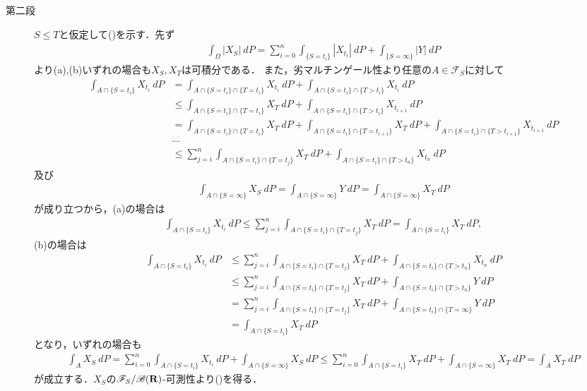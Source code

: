 \begin{prf}
\begin{description}
			\item[第二段]
				$S \leq T$と仮定して()を示す．先ず
				\begin{align}
					\int_\Omega |X_S|\ dP
					= \sum_{i=0}^n \int_{\{S=t_i\}} |X_{t_i}|\ dP
						+ \int_{\{S=\infty\}} |Y|\ dP
				\end{align}
				より(a),(b)いずれの場合も$X_S,X_T$は可積分である．
				また，劣マルチンゲール性より任意の$A \in \mathscr{F}_S$に対して
				\begin{align}
					\int_{A \cap \{S=t_i\}} X_{t_i}\ dP
					&= \int_{A \cap \{S=t_i\} \cap \{T=t_i\}} X_{t_i}\ dP
						+ \int_{A \cap \{S=t_i\} \cap \{T>t_i\}} X_{t_i}\ dP \\
					&\leq \int_{A \cap \{S=t_i\} \cap \{T=t_i\}} X_T\ dP
						+ \int_{A \cap \{S=t_i\} \cap \{T>t_i\}} X_{t_{i+1}}\ dP \\
					&= \int_{A \cap \{S=t_i\} \cap \{T=t_i\}} X_T\ dP
						+ \int_{A \cap \{S=t_i\} \cap \{T=t_{i+1}\}} X_T\ dP
						+ \int_{A \cap \{S=t_i\} \cap \{T>t_{i+1}\}} X_{t_{i+1}}\ dP \\
					&\cdots \\
					&\leq \sum_{j=i}^n \int_{A \cap \{S=t_i\} \cap \{T=t_j\}} X_T\ dP
						+ \int_{A \cap \{S=t_i\} \cap \{T>t_n\}} X_{t_n}\ dP
				\end{align}
				及び
				\begin{align}
					\int_{A \cap \{S=\infty\}} X_S\ dP
					= \int_{A \cap \{S=\infty\}} Y\ dP
					= \int_{A \cap \{S=\infty\}} X_T\ dP
				\end{align}
				が成り立つから，(a)の場合は
				\begin{align}
					\int_{A \cap \{S=t_i\}} X_{t_i}\ dP \leq
					\sum_{j=i}^n \int_{A \cap \{S=t_i\} \cap \{T=t_j\}} X_T\ dP
					= \int_{A \cap \{S=t_i\}} X_T\ dP,
				\end{align}
				(b)の場合は
				\begin{align}
					\int_{A \cap \{S=t_i\}} X_{t_i}\ dP
					&\leq \sum_{j=i}^n \int_{A \cap \{S=t_i\} \cap \{T=t_j\}} X_T\ dP
						+ \int_{A \cap \{S=t_i\} \cap \{T>t_n\}} X_{t_n}\ dP \\
					&\leq \sum_{j=i}^n \int_{A \cap \{S=t_i\} \cap \{T=t_j\}} X_T\ dP
						+ \int_{A \cap \{S=t_i\} \cap \{T>t_n\}} Y\ dP \\
					&= \sum_{j=i}^n \int_{A \cap \{S=t_i\} \cap \{T=t_j\}} X_T\ dP
						+ \int_{A \cap \{S=t_i\} \cap \{T=\infty\}} Y\ dP \\
					&= \int_{A \cap \{S=t_i\}} X_T\ dP
				\end{align}
				となり，いずれの場合も
				\begin{align}
					\int_A X_S\ dP
					= \sum_{i=0}^n \int_{A \cap \{S=t_i\}} X_{t_i}\ dP
						+ \int_{A \cap \{S=\infty\}} X_S\ dP
					\leq \sum_{i=0}^n \int_{A \cap \{S=t_i\}} X_T\ dP + \int_{A \cap \{S=\infty\}} X_T\ dP
					= \int_A X_T\ dP
				\end{align}
				が成立する．$X_S$の$\mathscr{F}_S/\mathscr{B}(\mathbf{R})$-可測性より()を得る．
			

\end{description}
\end{prf}
